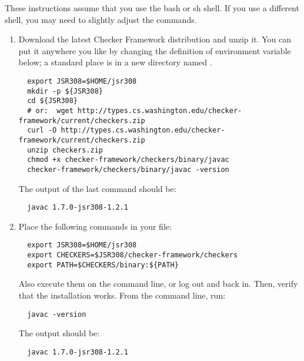 These instructions assume that you use the bash or sh shell.  If you use a
different shell, you may need to slightly adjust the commands.

\begin{enumerate}

\item
  Download the latest Checker Framework distribution
  and unzip it.  You can put it anywhere you like by changing the
  definition of environment variable  below; a standard place
  is in a
  new directory named .

\begin{Verbatim}
  export JSR308=$HOME/jsr308
  mkdir -p ${JSR308}
  cd ${JSR308}
  # or:  wget http://types.cs.washington.edu/checker-framework/current/checkers.zip
  curl -O http://types.cs.washington.edu/checker-framework/current/checkers.zip
  unzip checkers.zip
  chmod +x checker-framework/checkers/binary/javac
  checker-framework/checkers/binary/javac -version
\end{Verbatim}

The output of the last command should be:

\begin{Verbatim}
  javac 1.7.0-jsr308-1.2.1
\end{Verbatim}


\item
  Place the following commands in your  file:
\begin{Verbatim}
  export JSR308=$HOME/jsr308
  export CHECKERS=$JSR308/checker-framework/checkers
  export PATH=$CHECKERS/binary:${PATH}
\end{Verbatim}


Also execute them on the command line, or log out and back in.  Then,
verify that the installation works.  From the command line, run:

\begin{Verbatim}
  javac -version
\end{Verbatim}

The output should be:

\begin{Verbatim}
  javac 1.7.0-jsr308-1.2.1
\end{Verbatim}

\end{enumerate}

